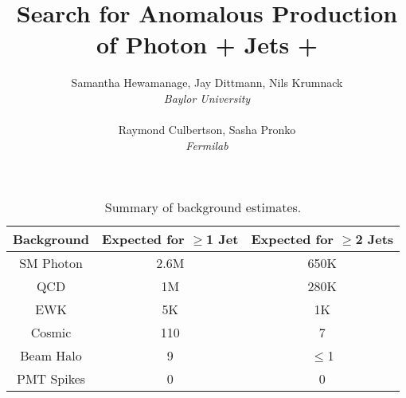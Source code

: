 \documentclass[11pt]{article}
\begin{document}
\title{Search for Anomalous Production of Photon + Jets + \met}
\author{Samantha Hewamanage, Jay Dittmann, Nils Krumnack\\
    {\it Baylor University} \\
    \\
Raymond Culbertson, Sasha Pronko \\
    {\it Fermilab} \\
}

\def\newpage{\par\penalty 100} %
\maketitle
\def\newpage{\par\vfill\penalty -10000} %


\begin{table}[h!]
\begin{center}
\begin{tabular} {|c|c|c|}
\hline
\bf{Background} & \bf{Expected for $\geq$1 Jet} & \bf{Expected for $\geq$2 Jets} \\
\hline
SM Photon  			& 2.6M & 650K \\
\hline
QCD					& 1M & 280K \\
\hline
EWK					& 5K & 1K \\
\hline
Cosmic 				& 110 & 7 \\
\hline
Beam Halo			& 9 & $\le$1\\
\hline
PMT Spikes  		  	&  0 	 & 0 \\
\hline
\end{tabular}
\end{center}
\caption{Summary of background estimates.}
\end{table}
\end{document}

